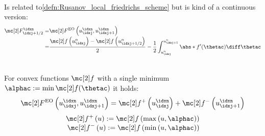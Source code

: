 \begin{defnbox}\nospacing
    \begin{defn}\label{defn:enquist_osher_scheme}\leavevmode\\
        Is related to\cref{defn:Rusanov_local_friedrichs_scheme} but is kind of a continuous version:
        \begin{align}
          \Flux_{\idxj+1/2}^{\idxn}=&\Flux^{\text{EO}}\left(u^{\idxn}_{\idxj},u^{\idxn}_{\idxj+1}\right)\\[-1\jot]
                                   =&\frac{\flux\left(u_{\idxj}^{n}\right)-\flux \left(u_{\idxj+1/2}^{n}\right)}{2} -\frac{1}{2}\int_{u_{\idxj}^{n}}^{u_{\idxj+1}^{n}}\abs*{f'(\thetac)}\diff\thetac\nonumber
        \end{align}
    \end{defn}
\end{defnbox}
\begin{corbox}\nospacing
    \begin{cor}\label{cor:engquist_oshner_for_convex_functions}\leavevmode\\
        For convex functions $\flux$ with a single minimum $\alphac:=\min\flux(\thetac)$ it holds:
        \begin{align}
          \Flux^{\text{EO}}\left(u^{\idxn}_{\idxj},u^{\idxn}_{\idxj+1}\right)=\flux^{+}\left(u_{\idxj}^{\idxn}\right)+\flux^{-}\left(u_{\idxj+1}^{\idxn}\right)
        \end{align}
        \begin{align*}
            \flux^{+}\left(u\right):=\flux \left(\max \left(u,\alphac\right) \right)\\[-1\jot]
            \flux^{-}\left(u\right):=\flux \left(\min \left(u,\alphac\right) \right)
        \end{align*}
    \end{cor}
\end{corbox}
